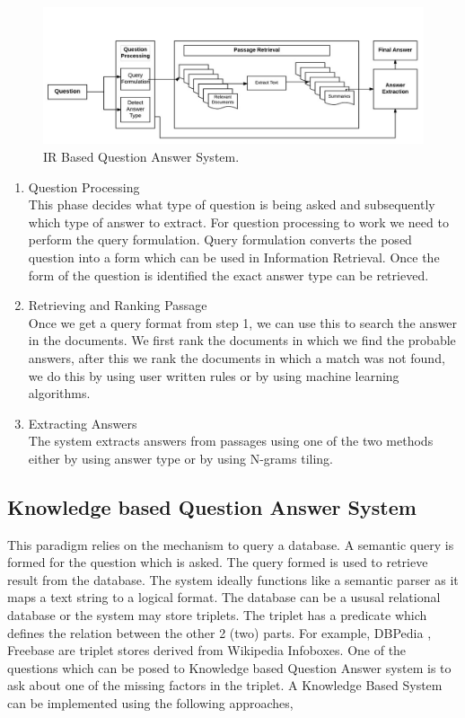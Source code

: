 \begin{figure}[htb]
\centering
\includegraphics[scale=0.8]{images/IR_BasedQA.jpg}
\caption{IR Based Question Answer System.} 
\label{fig:IR_BasedQA}
\end{figure}

\begin{enumerate}	
\item Question Processing \\
This phase decides what type of question is being asked and subsequently which type of answer to 
extract. For question processing to work we need to perform the query formulation. Query formulation converts the posed question into a form which can be used in Information Retrieval. Once the form of the question is identified the exact answer type can be retrieved. 
	
\item Retrieving and Ranking Passage \\
Once we get a query format from step 1, we can use this to search the answer in the documents.
We first rank the documents in which we find the probable answers, after this we rank the documents in which a match was not found, we do this by using user written rules or by using machine learning algorithms.

\break
\item Extracting Answers \\
The system extracts answers from passages using one of the two methods either by using answer type or by using N-grams tiling.
\end{enumerate}

\subsection{Knowledge based Question Answer System}
This paradigm relies on the mechanism to query a database. A semantic query is formed for the question which is asked. The query formed is used to retrieve result from the database. The system ideally functions like a semantic parser as it maps a text string to a logical format. The database can be a ususal relational database or the system may store triplets. The triplet has a predicate which defines the relation between the other 2 (two) parts. For example, DBPedia \cite{auer2007dbpedia}, Freebase \cite {bollacker2008freebase} are triplet stores derived from Wikipedia Infoboxes. One of the questions which can be posed to Knowledge based Question Answer system is to ask about one of the missing factors in the triplet. A Knowledge Based System can be implemented using the following approaches,


